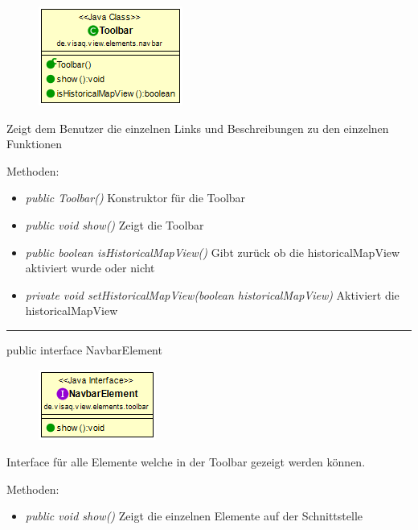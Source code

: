 \begin{minipage}{0.3\textwidth}
    \begin{figure}[H]
        \includegraphics[scale = 0.6]{media/frontend/view/de.view.elements.navbar/ToolbarClass.png}
    \end{figure}
    \end{minipage} \hfill
    \begin{minipage}{0.6\textwidth}
Zeigt dem Benutzer die einzelnen Links und Beschreibungen zu den einzelnen Funktionen
\end{minipage}

Methoden:
\begin{itemize} 
    \item \emph{public Toolbar()} Konstruktor für die Toolbar
    \item \emph{public void show()} Zeigt die Toolbar
    \item \emph{public boolean isHistoricalMapView()} Gibt zurück ob die historicalMapView aktiviert wurde oder nicht
    \item \emph{private void setHistoricalMapView(boolean historicalMapView)} Aktiviert die historicalMapView
\end{itemize}

\rule{\textwidth}{0.4pt} 
public interface NavbarElement 

\begin{minipage}{0.3\textwidth}
    \begin{figure}[H]
        \includegraphics[scale = 0.7]{media/frontend/view/de.view.elements.navbar/NavbarElementClass.png}
    \end{figure}
\end{minipage} \hfill
\begin{minipage}{0.6\textwidth}
Interface für alle Elemente welche in der Toolbar gezeigt werden können.
\end{minipage}

Methoden:
\begin{itemize} 
    \item \emph{public void show()} Zeigt die einzelnen Elemente auf der Schnittstelle
\end{itemize}
